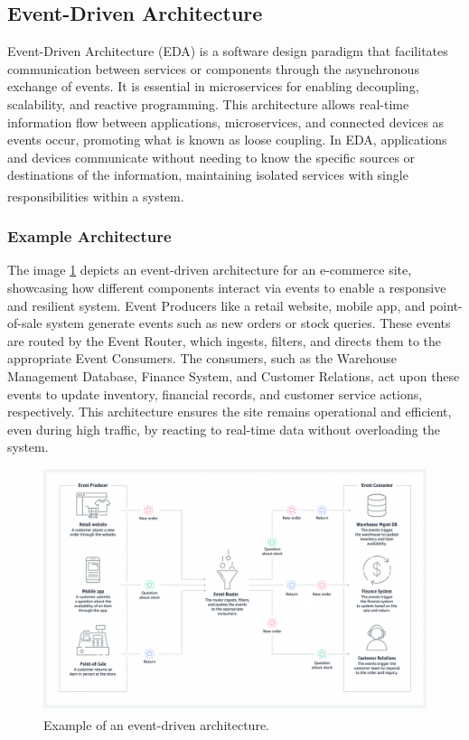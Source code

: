 \subsection{Event-Driven Architecture}
Event-Driven Architecture (EDA) is a software design paradigm that facilitates communication between
services or components through the asynchronous exchange of events. It is essential in microservices
for enabling decoupling, scalability, and reactive programming. This architecture allows real-time
information flow between applications, microservices, and connected devices as events occur,
promoting what is known as loose coupling. In EDA, applications and devices communicate without
needing to know the specific sources or destinations of the information, maintaining isolated
services with single responsibilities within a system\textsuperscript{\cite{event_1}}.

\subsubsection{Example Architecture}
The image \ref{fig:3_event_example} depicts an event-driven architecture for an e-commerce
site, showcasing how different components interact via events to enable a responsive and resilient
system. Event Producers like a retail website, mobile app, and point-of-sale system generate events
such as new orders or stock queries. These events are routed by the Event Router, which ingests,
filters, and directs them to the appropriate Event Consumers. The consumers, such as the Warehouse
Management Database, Finance System, and Customer Relations, act upon these events to update
inventory, financial records, and customer service actions, respectively. This architecture ensures
the site remains operational and efficient, even during high traffic, by reacting to real-time data
without overloading the system.

\begin{figure}
    \centering
    \includegraphics[scale=0.35]{Pictures/3_event_example.png}
    \caption{Example of an event-driven architecture\textsuperscript{\cite{event_2}}.}
    \label{fig:3_event_example}
\end{figure}

